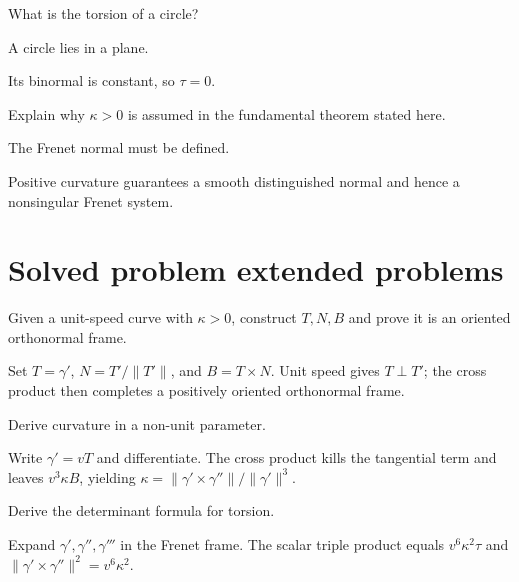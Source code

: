 \begin{exercise}\label{exr:vii13-23}
What is the torsion of a circle?
\end{exercise}
\begin{hint}
A circle lies in a plane.
\end{hint}
\begin{solution}
Its binormal is constant, so \(\tau=0\).
\end{solution}

\begin{exercise}\label{exr:vii13-24}
Explain why \(\kappa>0\) is assumed in the fundamental theorem stated here.
\end{exercise}
\begin{hint}
The Frenet normal must be defined.
\end{hint}
\begin{solution}
Positive curvature guarantees a smooth distinguished normal and hence a nonsingular Frenet system.
\end{solution}

\section{Solved problem extended problems}
\begin{problem}\label{prob:vii13-01}
Given a unit-speed curve with \(\kappa>0\), construct \(T,N,B\) and prove it is an oriented orthonormal frame.
\end{problem}
\begin{solution}
Set \(T=\gamma'\), \(N=T'/\|T'\|\), and \(B=T\times N\). Unit speed gives \(T\perp T'\); the cross product then completes a positively oriented orthonormal frame.
\end{solution}

\begin{problem}\label{prob:vii13-02}
Derive curvature in a non-unit parameter.
\end{problem}
\begin{solution}
Write \(\gamma'=vT\) and differentiate. The cross product kills the tangential term and leaves \(v^3\kappa B\), yielding \(\kappa=\|\gamma'\times\gamma''\|/\|\gamma'\|^3\).
\end{solution}

\begin{problem}\label{prob:vii13-03}
Derive the determinant formula for torsion.
\end{problem}
\begin{solution}
Expand \(\gamma',\gamma'',\gamma'''\) in the Frenet frame. The scalar triple product equals \(v^6\kappa^2\tau\) and \(\|\gamma'\times\gamma''\|^2=v^6\kappa^2\).
\end{solution}

